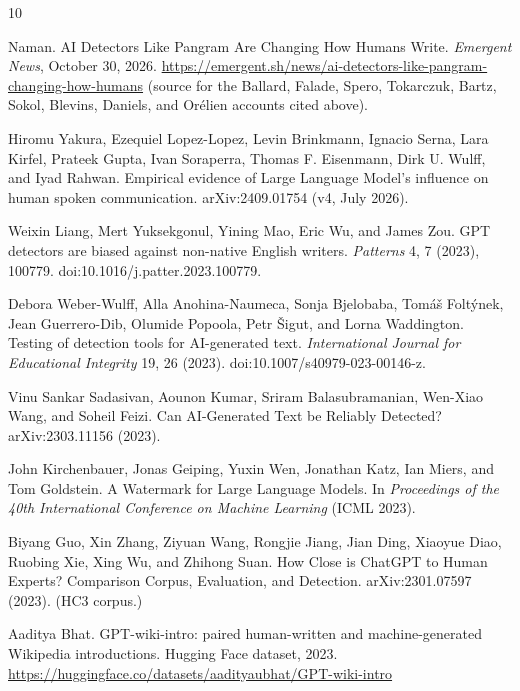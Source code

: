 \documentclass[sigconf,nonacm]{acmart}
\begin{document}
\begin{thebibliography}{10}

Naman.
\newblock AI Detectors Like Pangram Are Changing How Humans Write.
\newblock \emph{Emergent News}, October 30, 2026.
\newblock \url{https://emergent.sh/news/ai-detectors-like-pangram-changing-how-humans} (source for the Ballard, Falade, Spero, Tokarczuk, Bartz, Sokol, Blevins, Daniels, and Or\'elien accounts cited above).

Hiromu Yakura, Ezequiel Lopez-Lopez, Levin Brinkmann, Ignacio Serna, Lara Kirfel, Prateek Gupta, Ivan Soraperra, Thomas F. Eisenmann, Dirk U. Wulff, and Iyad Rahwan.
\newblock Empirical evidence of Large Language Model's influence on human spoken communication.
\newblock arXiv:2409.01754 (v4, July 2026).

Weixin Liang, Mert Yuksekgonul, Yining Mao, Eric Wu, and James Zou.
\newblock GPT detectors are biased against non-native English writers.
\newblock \emph{Patterns} 4, 7 (2023), 100779. doi:10.1016/j.patter.2023.100779.

Debora Weber-Wulff, Alla Anohina-Naumeca, Sonja Bjelobaba, Tom\'a\v{s} Folt\'ynek, Jean Guerrero-Dib, Olumide Popoola, Petr \v{S}igut, and Lorna Waddington.
\newblock Testing of detection tools for AI-generated text.
\newblock \emph{International Journal for Educational Integrity} 19, 26 (2023). doi:10.1007/s40979-023-00146-z.

Vinu Sankar Sadasivan, Aounon Kumar, Sriram Balasubramanian, Wen-Xiao Wang, and Soheil Feizi.
\newblock Can AI-Generated Text be Reliably Detected?
\newblock arXiv:2303.11156 (2023).

John Kirchenbauer, Jonas Geiping, Yuxin Wen, Jonathan Katz, Ian Miers, and Tom Goldstein.
\newblock A Watermark for Large Language Models.
\newblock In \emph{Proceedings of the 40th International Conference on Machine Learning} (ICML 2023).

Biyang Guo, Xin Zhang, Ziyuan Wang, Rongjie Jiang, Jian Ding, Xiaoyue Diao, Ruobing Xie, Xing Wu, and Zhihong Suan.
\newblock How Close is ChatGPT to Human Experts? Comparison Corpus, Evaluation, and Detection.
\newblock arXiv:2301.07597 (2023). (HC3 corpus.)

Aaditya Bhat.
\newblock GPT-wiki-intro: paired human-written and machine-generated Wikipedia introductions.
\newblock Hugging Face dataset, 2023. \url{https://huggingface.co/datasets/aadityaubhat/GPT-wiki-intro}


\end{thebibliography}
\end{document}
